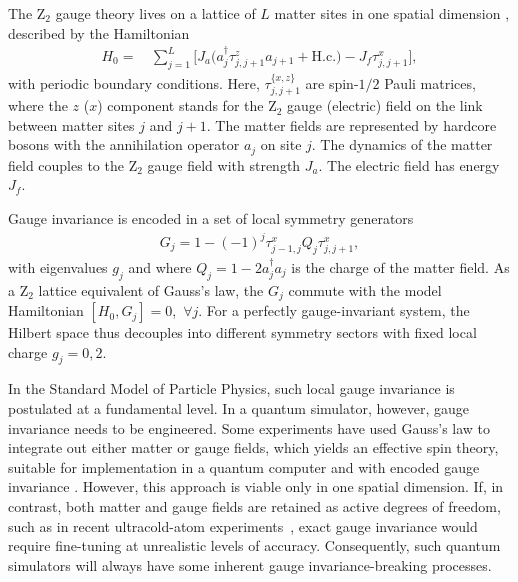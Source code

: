 \documentclass[aps,prl,reprint,twocolumn,superscriptaddress,floatfix,nofootinbib]{revtex4-1}
\begin{document}
	The $\mathrm{Z}_2$ gauge theory lives on a lattice of $L$ matter sites in one spatial dimension \cite{footnote}, described by the Hamiltonian
	\begin{align}\label{eq:H0}
	H_0=&\,\sum_{j=1}^L\big[J_a\big(a^\dagger_j\tau^z_{j,j+1}a_{j+1}+\text{H.c.}\big)-J_f\tau^x_{j,j+1}\big],
	\end{align}
	with periodic boundary conditions. Here, $\tau_{j,j+1}^{\{x,z\}}$ are spin-$1/2$ Pauli matrices, where the $z$ ($x$) component stands for the $\mathrm{Z}_2$ gauge (electric) field on the link between matter sites $j$ and $j+1$. The matter fields are represented by hardcore bosons with the annihilation operator $a_j$ on site $j$. The dynamics of the matter field couples to the $\mathrm{Z}_2$ gauge field with strength $J_a$. The electric field has energy $J_f$. 
	
	Gauge invariance is encoded in a set of local symmetry generators
	\begin{align}\label{eq:Gauss}
	G_j=1-(-1)^j\tau^x_{j-1,j}Q_j\tau^x_{j,j+1},
	\end{align}
	with eigenvalues $g_j$ and where $Q_j=1-2a_j^\dagger a_j$ is the charge of the matter field. 
	As a $\mathrm{Z}_2$ lattice equivalent of Gauss's law, the $G_j$ commute with the model Hamiltonian $[H_0,G_j]=0$,~$\forall j$. 
	For a perfectly gauge-invariant system, the Hilbert space thus decouples into different symmetry sectors with fixed local charge $g_j=0,2$.   
	
	In the Standard Model of Particle Physics, such local gauge invariance is postulated at a fundamental level. 
	In a quantum simulator, however, gauge invariance needs to be engineered. 
	Some experiments have used Gauss's law to integrate out either matter or gauge fields, which yields an effective spin theory, suitable for implementation in a quantum computer and with encoded gauge invariance \cite{Martinez2016,Bernien2017,Kokail2019}. 
	However, this approach is viable only in one spatial dimension. 
	If, in contrast, both matter and gauge fields are retained as active degrees of freedom, such as in recent ultracold-atom  experiments~\cite{Schweizer2019,Mil2019,Yang2019}, 
	exact gauge invariance would require fine-tuning at unrealistic levels of accuracy. 
	Consequently, such quantum simulators will always have some inherent gauge invariance-breaking processes. 
	
\end{document}
